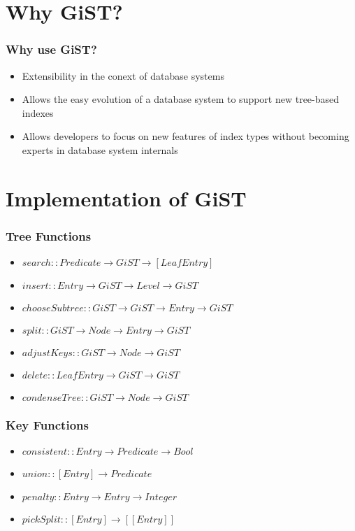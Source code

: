 \documentclass{beamer}
\begin{document}
\section {Why GiST?}
\begin{frame}%
  \frametitle{Why use GiST?} %
  
  \begin {itemize}
  \item Extensibility in the conext of database systems
  \pause \item Allows the easy evolution of a database system to support new tree-based indexes
  \pause \item Allows developers to focus on new features of index types without becoming experts in database system internals
  \end {itemize}
\end{frame}

\section {Implementation of GiST}
\begin{frame}%
  \frametitle{Tree Functions} %
  \begin {itemize}
  \item $search :: Predicate \rightarrow GiST \rightarrow [LeafEntry]$
  \pause \item $insert :: Entry \rightarrow GiST \rightarrow Level \rightarrow GiST$
  \pause \item $chooseSubtree :: GiST \rightarrow GiST \rightarrow Entry \rightarrow GiST $
  \pause \item $split ::  GiST \rightarrow Node \rightarrow Entry \rightarrow GiST$
  \pause \item $adjustKeys :: GiST \rightarrow Node \rightarrow GiST$
  \pause \item $delete :: LeafEntry \rightarrow GiST \rightarrow GiST$
  \pause \item $condenseTree ::  GiST \rightarrow Node \rightarrow GiST$
  \end {itemize}
\end{frame}
\begin{frame}%
  \frametitle{Key Functions} %
  \begin {itemize}
  \item $consistent :: Entry \rightarrow Predicate \rightarrow Bool$
  \pause \item $union ::  [Entry] \rightarrow Predicate$
  \pause \item $penalty :: Entry \rightarrow Entry \rightarrow Integer$
  \pause \item $pickSplit ::  [Entry] \rightarrow [[Entry]]$
  \end {itemize}
\end{frame}
\end{document}
